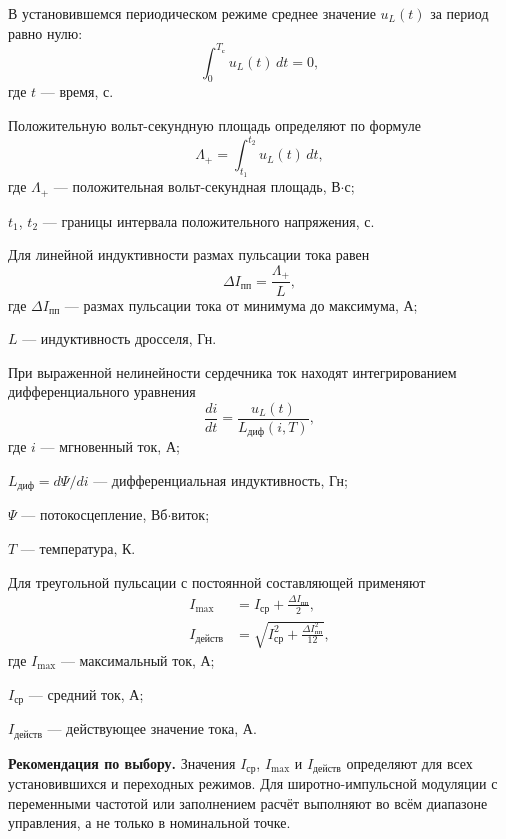 \documentclass[14pt,a4paper]{extarticle}
\newcommand{\recommend}{\par\noindent\textbf{Рекомендация по выбору.} }
\begin{document}
В установившемся периодическом режиме среднее значение $u_L(t)$ за период
равно нулю:
\begin{equation}
 \int_{0}^{T_{\text{с}}}u_L(t)\,dt=0,
 \label{eq:volt-second-balance}
\end{equation}
где $t$ --- время, с.

Положительную вольт-секундную площадь определяют по формуле
\begin{equation}
 \Lambda_+=\int_{t_1}^{t_2}u_L(t)\,dt,
 \label{eq:volt-second-area}
\end{equation}
где $\Lambda_+$ --- положительная вольт-секундная площадь, В$\cdot$с;\par\noindent
$t_1$, $t_2$ --- границы интервала положительного напряжения, с.

Для линейной индуктивности размах пульсации тока равен
\begin{equation}
 \Delta I_{\text{пп}}=\frac{\Lambda_+}{L},
 \label{eq:ripple-linear}
\end{equation}
где $\Delta I_{\text{пп}}$ --- размах пульсации тока от минимума до
максимума, А;\par\noindent
$L$ --- индуктивность дросселя, Гн.

При выраженной нелинейности сердечника ток находят интегрированием
дифференциального уравнения
\begin{equation}
 \frac{di}{dt}=\frac{u_L(t)}
 {L_{\text{диф}}\!\left(i,T\right)},
 \label{eq:current-nonlinear}
\end{equation}
где $i$ --- мгновенный ток, А;\par\noindent
$L_{\text{диф}}=d\Psi/di$ --- дифференциальная индуктивность, Гн;\par\noindent
$\Psi$ --- потокосцепление, Вб$\cdot$виток;\par\noindent
$T$ --- температура, К.

Для треугольной пульсации с постоянной составляющей применяют
\begin{align}
 I_{\max}&=I_{\text{ср}}+\frac{\Delta I_{\text{пп}}}{2},
 \label{eq:ipeak}\\
 I_{\text{действ}}&=
 \sqrt{I_{\text{ср}}^2+\frac{\Delta I_{\text{пп}}^2}{12}},
 \label{eq:irms-tri}
\end{align}
где $I_{\max}$ --- максимальный ток, А;\par\noindent
$I_{\text{ср}}$ --- средний ток, А;\par\noindent
$I_{\text{действ}}$ --- действующее значение тока, А.

\recommend Значения $I_{\text{ср}}$, $I_{\max}$ и $I_{\text{действ}}$
определяют для всех установившихся и переходных режимов. Для
широтно-импульсной модуляции с переменными частотой или заполнением
расчёт выполняют во всём диапазоне управления, а не только в номинальной
точке.
\end{document}
